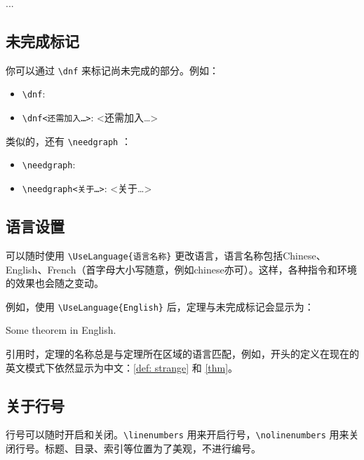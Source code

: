 \documentclass{einfart}
\begin{document}
\begin{proofidea}
    ...
\end{proofidea}

\subsection{未完成标记}

你可以通过 \lstinline|\dnf| 来标记尚未完成的部分。例如：
\begin{itemize}
    \item \lstinline|\dnf|: \quad \dnf
    \item \lstinline|\dnf<还需加入…>|: \quad \dnf<还需加入…>
\end{itemize}

类似的，还有 \lstinline|\needgraph| ：
\begin{itemize}
    \item \lstinline|\needgraph|: \needgraph
    \item \lstinline|\needgraph<关于…>|: \needgraph<关于…>
\end{itemize}

\subsection{语言设置}
可以随时使用 \lstinline|\UseLanguage{语言名称}| 更改语言，语言名称包括Chinese、English、French（首字母大小写随意，例如chinese亦可）。这样，各种指令和环境的效果也会随之变动。

例如，使用 \lstinline|\UseLanguage{English}| 后，定理与未完成标记会显示为：

\begin{theorem}[Useless]\label{thm}
    Some theorem in English. \dnf
\end{theorem}

引用时，定理的名称总是与定理所在区域的语言匹配，例如，开头的定义在现在的英文模式下依然显示为中文：\cref{def: strange} 和 \cref{thm}。


\subsection{关于行号}
行号可以随时开启和关闭。\lstinline|\linenumbers| 用来开启行号，\lstinline|\nolinenumbers| 用来关闭行号。标题、目录、索引等位置为了美观，不进行编号。
\end{document}
